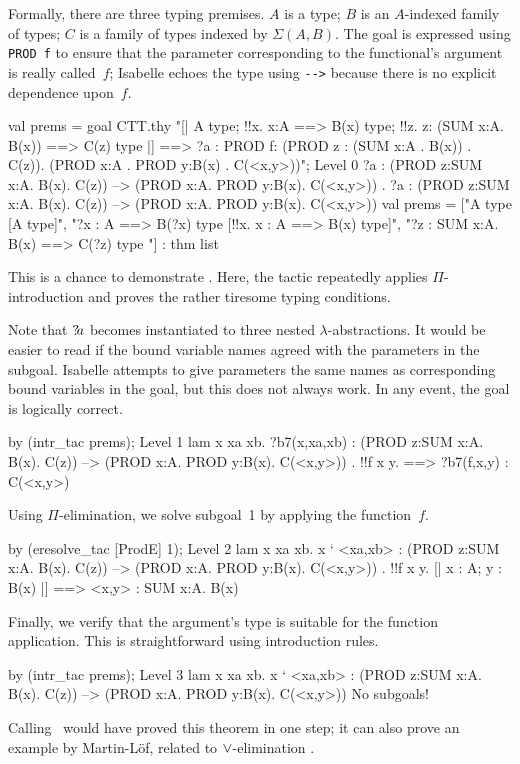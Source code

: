 Formally, there are three typing premises.  $A$ is a type; $B$ is an
$A$-indexed family of types; $C$ is a family of types indexed by
$\Sigma(A,B)$.  The goal is expressed using \hbox{\tt PROD f} to ensure
that the parameter corresponding to the functional's argument is really
called~$f$; Isabelle echoes the type using \verb|-->| because there is no
explicit dependence upon~$f$.
\begin{ttbox}
val prems = goal CTT.thy
    "[| A type; !!x. x:A ==> B(x) type;                           \ttback
\ttback               !!z. z: (SUM x:A. B(x)) ==> C(z) type             \ttback
\ttback    |] ==> ?a : PROD f: (PROD z : (SUM x:A . B(x)) . C(z)).      \ttback
\ttback                     (PROD x:A . PROD y:B(x) . C(<x,y>))";
\ttbreak
{\out Level 0}
{\out ?a : (PROD z:SUM x:A. B(x). C(z)) -->}
{\out      (PROD x:A. PROD y:B(x). C(<x,y>))}
{. ?a : (PROD z:SUM x:A. B(x). C(z)) -->}
{\out          (PROD x:A. PROD y:B(x). C(<x,y>))}
\ttbreak
{\out val prems = ["A type  [A type]",}
{\out              "?x : A ==> B(?x) type  [!!x. x : A ==> B(x) type]",}
{\out              "?z : SUM x:A. B(x) ==> C(?z) type}
{\out               [!!z. z : SUM x:A. B(x) ==> C(z) type]"] : thm list}
\end{ttbox}
This is a chance to demonstrate .  Here, the tactic
repeatedly applies $\Pi$-introduction and proves the rather
tiresome typing conditions.  

Note that ${?\!a}$ becomes instantiated to three nested
$\lambda$-abstractions.  It would be easier to read if the bound variable
names agreed with the parameters in the subgoal.  Isabelle attempts to give
parameters the same names as corresponding bound variables in the goal, but
this does not always work.  In any event, the goal is logically correct.
\begin{ttbox}
by (intr_tac prems);
{\out Level 1}
{\out lam x xa xb. ?b7(x,xa,xb)}
{\out : (PROD z:SUM x:A. B(x). C(z)) --> (PROD x:A. PROD y:B(x). C(<x,y>))}
{. !!f x y.}
{ ==>}
{\out        ?b7(f,x,y) : C(<x,y>)}
\end{ttbox}
Using $\Pi$-elimination, we solve subgoal~1 by applying the function~$f$.
\begin{ttbox}
by (eresolve_tac [ProdE] 1);
{\out Level 2}
{\out lam x xa xb. x ` <xa,xb>}
{\out : (PROD z:SUM x:A. B(x). C(z)) --> (PROD x:A. PROD y:B(x). C(<x,y>))}
{. !!f x y. [| x : A; y : B(x) |] ==> <x,y> : SUM x:A. B(x)}
\end{ttbox}
Finally, we verify that the argument's type is suitable for the function
application.  This is straightforward using introduction rules.
\begin{ttbox}
by (intr_tac prems);
{\out Level 3}
{\out lam x xa xb. x ` <xa,xb>}
{\out : (PROD z:SUM x:A. B(x). C(z)) --> (PROD x:A. PROD y:B(x). C(<x,y>))}
{\out No subgoals!}
\end{ttbox}
Calling~ would have proved this theorem in one step; it can
also prove an example by Martin-L\"of, related to $\vee$-elimination
\cite[page~58]{martinlof84}.


